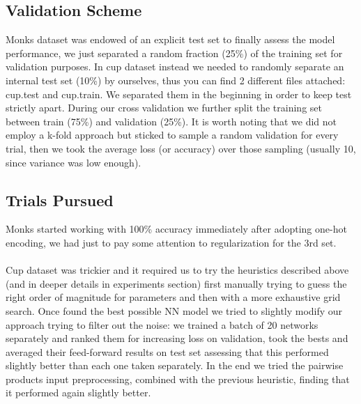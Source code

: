 \subsection{Validation Scheme}

Monks dataset was endowed of an explicit test set to finally assess the model performance, we just separated a random fraction (25\%) of the training set for validation purposes. In cup dataset instead we needed to randomly separate an internal test set (10\%) by ourselves, thus you can find 2 different files attached: cup.test and cup.train. We separated them in the beginning in order to keep test strictly apart. During our cross validation we further split the training set between train (75\%) and validation (25\%). It is worth noting that we did not employ a k-fold approach but sticked to sample a random validation for every trial, then we took the average loss (or accuracy) over those sampling (usually 10, since variance was low enough).

\subsection{Trials Pursued}

Monks started working with 100\% accuracy immediately after adopting one-hot encoding, we had just to pay some attention to regularization for the 3rd set.

\paragraph{}
Cup dataset was trickier and it required us to try the heuristics described above (and in deeper details in experiments section) first manually trying to guess the right order of magnitude for parameters and then with a more exhaustive grid search. Once found the best possible NN model we tried to slightly modify our approach trying to filter out the noise: we trained a batch of 20 networks separately and ranked them for increasing loss on validation, took the bests and averaged their feed-forward results on test set assessing that this performed slightly better than each one taken separately. In the end we tried the pairwise products input preprocessing, combined with the previous heuristic, finding that it performed again slightly better. 


